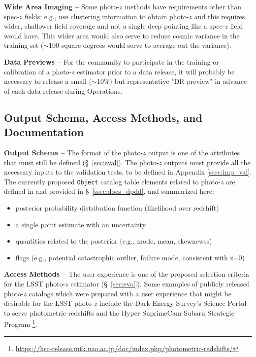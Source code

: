 \documentclass[DM,lsstdraft,toc]{lsstdoc}
\begin{document}
{\bf Wide Area Imaging --} 
Some photo-$z$ methods have requirements other than spec-$z$ fields: e.g., \citet{2019MNRAS.483.2801S} use clustering information to obtain photo-$z$ and this requires wider, shallower field coverage and not a single deep pointing like a spec-$z$ field would have. 
This wider area would also serve to reduce cosmic variance in the training set ($\sim$100 square degrees would serve to average out the variance).

{\bf Data Previews --}
For the community to participate in the training or calibration of a photo-$z$ estimator prior to a data release, it will probably be necessary to release a small ($\sim10\%$) but representative "DR preview" in advance of each data release during Operations.


\subsection{Output Schema, Access Methods, and Documentation}\label{ssec:dp_pz}

{\bf Output Schema --} 
The format of the photo-$z$ output is one of the attributes that must still be defined (\S~\ref{sec:eval}). 
The photo-$z$ outputs must provide all the necessary inputs to the validation tests, to be defined in Appendix \ref{ssec:imp_val}.
The currently proposed {\tt Object} catalog table elements related to photo-$z$ are defined in  and provided in \S~\ref{ssec:docs_dpdd}, and summarized here:
\vspace{-15pt}
\begin{itemize}
\item posterior probability distribution function (likelihood over redshift)
\item a single point estimate with an uncertainty
\item quantities related to the posterior (e.g., mode, mean, skewnewss)
\item flags (e.g., potential catastrophic outlier, failure mode, consistent with z=0)
\end{itemize}

{\bf Access Methods --} 
The user experience is one of the proposed selection criteria for the LSST photo-$z$ estimator (\S~\ref{sec:eval}). 
Some examples of publicly released photo-$z$ catalogs which were prepared with a user experience that might be desirable for the LSST photo-$z$ include the Dark Energy Survey's Science Portal to serve photometric redshifts \cite{2018A&C....25...58G} and the Hyper SuprimeCam Subaru Strategic Program \cite{2018PASJ...70S...9T}\footnote{\url{https://hsc-release.mtk.nao.ac.jp/doc/index.php/photometric-redshifts/}}.
\end{document}

